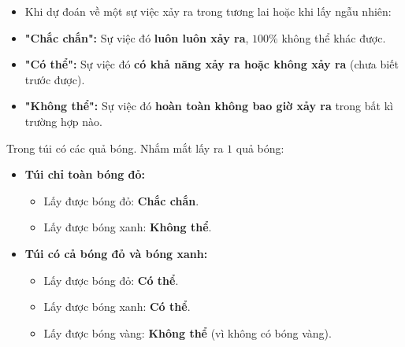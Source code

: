 \documentclass[10pt,a4paper]{article}
\begin{document}
\noindent
\begin{minipage}[t]{0.49\textwidth}\vspace{0pt}
\begin{tcolorbox}[
  enhanced,
  colback=violet!4!white,
  colframe=violet!75!black,
  arc=2mm, boxrule=0.8pt,
  left=2mm, right=2mm, top=1.8mm, bottom=1.8mm,
  title={\footnotesize\bfseries\color{white}\faKey\ 1. Ý nghĩa của ba cụm từ xác suất}
]
{\footnotesize
\begin{itemize}\setlength{\itemsep}{1pt}\setlength{\leftskip}{-2.5mm}
  \item Khi dự đoán về một sự việc xảy ra trong tương lai hoặc khi lấy ngẫu nhiên:
  \item \textbf{"Chắc chắn":} Sự việc đó \textbf{luôn luôn xảy ra}, $100\%$ không thể khác được.
  \item \textbf{"Có thể":} Sự việc đó \textbf{có khả năng xảy ra hoặc không xảy ra} (chưa biết trước được).
  \item \textbf{"Không thể":} Sự việc đó \textbf{hoàn toàn không bao giờ xảy ra} trong bất kì trường hợp nào.
\end{itemize}
}
\end{tcolorbox}
\end{minipage}
\hfill
\begin{minipage}[t]{0.49\textwidth}\vspace{0pt}
\begin{tcolorbox}[
  enhanced,
  colback=teal!4!white,
  colframe=teal!75!black,
  arc=2mm, boxrule=0.8pt,
  left=2mm, right=2mm, top=1.8mm, bottom=1.8mm,
  title={\footnotesize\bfseries\color{white}\faSliders\ 2. Mô hình thực nghiệm túi bóng màu}
]
{\footnotesize
Trong túi có các quả bóng. Nhắm mắt lấy ra $1$ quả bóng:
\begin{itemize}\setlength{\itemsep}{1pt}\setlength{\leftskip}{-2.5mm}
  \item \textbf{Túi chỉ toàn bóng đỏ:}
  \begin{itemize}\setlength{\itemsep}{0.5pt}\setlength{\leftskip}{-2mm}
    \item Lấy được bóng đỏ: \textbf{Chắc chắn}.
    \item Lấy được bóng xanh: \textbf{Không thể}.
  \end{itemize}
  \item \textbf{Túi có cả bóng đỏ và bóng xanh:}
  \begin{itemize}\setlength{\itemsep}{0.5pt}\setlength{\leftskip}{-2mm}
    \item Lấy được bóng đỏ: \textbf{Có thể}.
    \item Lấy được bóng xanh: \textbf{Có thể}.
    \item Lấy được bóng vàng: \textbf{Không thể} (vì không có bóng vàng).
  \end{itemize}
\end{itemize}
}
\end{tcolorbox}
\end{minipage}
\end{document}
